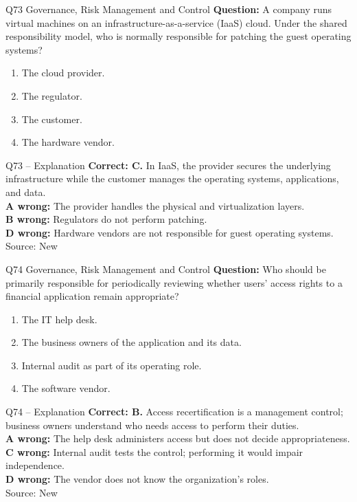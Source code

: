 \documentclass[aspectratio=169,10pt]{beamer}
\begin{document}
\begin{frame}[t]{Q73 \hfill {\scriptsize Governance, Risk Management and Control}}
	\small
	\textbf{Question:} A company runs virtual machines on an infrastructure-as-a-service (IaaS) cloud. Under the shared responsibility model, who is normally responsible for patching the guest operating systems?
	\begin{enumerate}[label=\Alph*.,itemsep=1pt,topsep=3pt]
			\item The cloud provider.
			\item The regulator.
			\item The customer.
			\item The hardware vendor.
	\end{enumerate}
\end{frame}

\begin{frame}[t]{Q73 -- Explanation}
	\footnotesize
	\textbf{Correct: C.} In IaaS, the provider secures the underlying infrastructure while the customer manages the operating systems, applications, and data. \\[5pt]
\textbf{A wrong:} The provider handles the physical and virtualization layers. \\[3pt]
\textbf{B wrong:} Regulators do not perform patching. \\[3pt]
\textbf{D wrong:} Hardware vendors are not responsible for guest operating systems. \\[3pt]
	\vfill {\tiny Source: New}
\end{frame}

\begin{frame}[t]{Q74 \hfill {\scriptsize Governance, Risk Management and Control}}
	\small
	\textbf{Question:} Who should be primarily responsible for periodically reviewing whether users' access rights to a financial application remain appropriate?
	\begin{enumerate}[label=\Alph*.,itemsep=1pt,topsep=3pt]
			\item The IT help desk.
			\item The business owners of the application and its data.
			\item Internal audit as part of its operating role.
			\item The software vendor.
	\end{enumerate}
\end{frame}

\begin{frame}[t]{Q74 -- Explanation}
	\footnotesize
	\textbf{Correct: B.} Access recertification is a management control; business owners understand who needs access to perform their duties. \\[5pt]
\textbf{A wrong:} The help desk administers access but does not decide appropriateness. \\[3pt]
\textbf{C wrong:} Internal audit tests the control; performing it would impair independence. \\[3pt]
\textbf{D wrong:} The vendor does not know the organization's roles. \\[3pt]
	\vfill {\tiny Source: New}
\end{frame}
\end{document}
